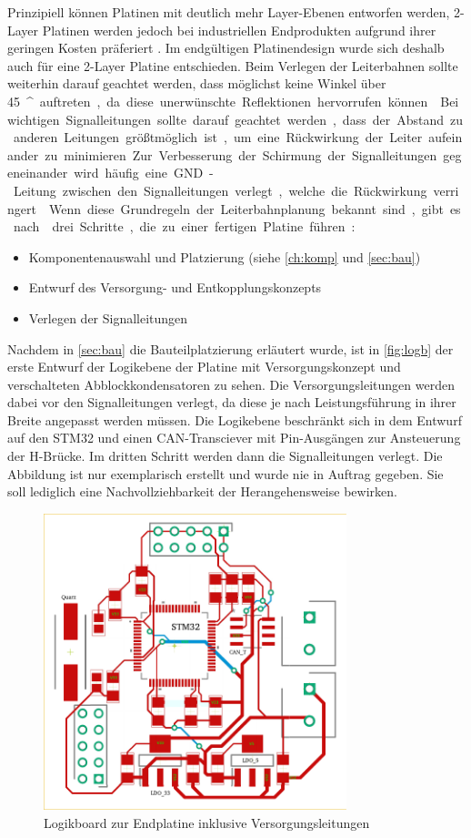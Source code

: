 Prinzipiell können Platinen mit deutlich mehr Layer-Ebenen entworfen werden, 2-Layer Platinen werden jedoch bei industriellen Endprodukten aufgrund ihrer geringen Kosten präferiert \cite[S.13]{emcdes}. Im endgültigen Platinendesign wurde sich deshalb auch für eine 2-Layer Platine entschieden. Beim Verlegen der Leiterbahnen sollte weiterhin darauf geachtet werden, dass möglichst keine Winkel über \SI{45}{^\circ} auftreten, da diese unerwünschte Reflektionen hervorrufen können \cite[S.17]{emcdes}. Bei wichtigen Signalleitungen sollte darauf geachtet werden, dass der Abstand zu anderen Leitungen größtmöglich ist, um eine Rückwirkung der Leiter aufeinander zu minimieren. Zur Verbesserung der Schirmung der Signalleitungen gegeneinander wird häufig eine GND-Leitung zwischen den Signalleitungen verlegt, welche die Rückwirkung verringert \cite[S.45]{Franz2012}.
Wenn diese Grundregeln der Leiterbahnplanung bekannt sind, gibt es nach \cite[S.12]{emcdes} drei Schritte, die zu einer fertigen Platine führen:
\begin{itemize}
	\item Komponentenauswahl und Platzierung (siehe \autoref{ch:komp} und \autoref{sec:bau})
	\item Entwurf des Versorgung- und Entkopplungskonzepts
	\item Verlegen der Signalleitungen
\end{itemize}
Nachdem in \autoref{sec:bau} die Bauteilplatzierung erläutert wurde, ist in \autoref{fig:logb} der erste Entwurf der Logikebene der Platine mit Versorgungskonzept und verschalteten Abblockkondensatoren zu sehen. Die Versorgungsleitungen werden dabei vor den Signalleitungen verlegt, da diese je nach Leistungsführung in ihrer Breite angepasst werden müssen. Die Logikebene beschränkt sich in dem Entwurf auf den STM32 und einen CAN-Transciever mit Pin-Ausgängen zur Ansteuerung der H-Brücke. Im dritten Schritt werden dann die Signalleitungen verlegt. Die Abbildung ist nur exemplarisch erstellt und wurde nie in Auftrag gegeben. Sie soll lediglich eine Nachvollziehbarkeit der Herangehensweise bewirken.
\begin{figure}[H]%
\centering
\includegraphics[width=250pt]{./Bilder/logb}%
\caption{Logikboard zur Endplatine inklusive Versorgungsleitungen}%
\label{fig:logb}%
\end{figure}\noindent
